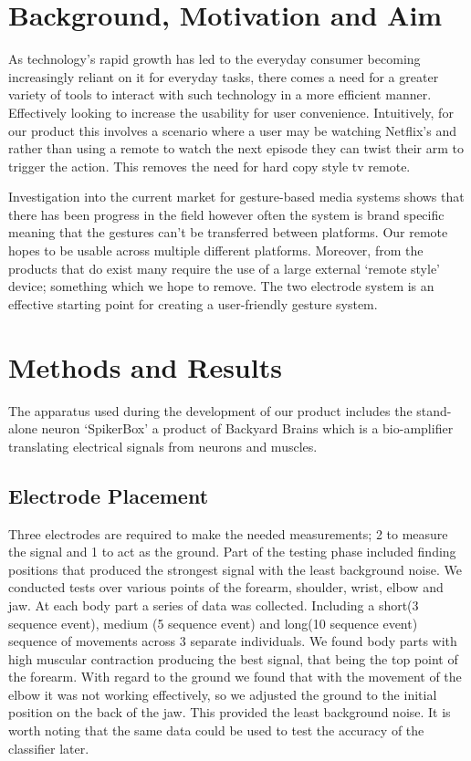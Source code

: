 \documentclass[oneside]{article}
\begin{document}
\section{Background, Motivation and Aim}
As technology's rapid growth has led to the everyday consumer becoming increasingly reliant on it for everyday tasks, there comes a need for a greater variety of tools to interact with such technology in a more efficient manner. Effectively looking to increase the usability for user convenience. Intuitively, for our product this involves a scenario where a user may be watching Netflix’s and rather than using a remote to watch the next episode they can twist their arm to trigger the action. This removes the need for hard copy style tv remote. 

Investigation into the current market for gesture-based media systems shows that there has been progress in the field however often the system is brand specific meaning that the gestures can’t be transferred between platforms. Our remote hopes to be usable across multiple different platforms. Moreover, from the products that do exist many require the use of a large external ‘remote style’ device; something which we hope to remove. The two electrode system is an effective starting point for creating a user-friendly gesture system. 


\section{Methods and Results}
The apparatus used during the development of our product includes the stand-alone neuron ‘SpikerBox’ a product of Backyard Brains which is a bio-amplifier translating electrical signals from neurons and  muscles. 

\subsection{Electrode Placement}
Three electrodes are required to make the needed measurements; 2 to measure the signal and 1 to act as the ground. Part of the testing phase included finding positions that produced the strongest signal with the least background noise. We conducted tests over various points of the forearm, shoulder, wrist, elbow and jaw. At each body part a series of data was collected. Including a short(3 sequence event), medium (5 sequence event) and long(10 sequence event) sequence of movements across 3 separate individuals. We found body parts with high muscular contraction producing the best signal, that being the top point of the forearm. With regard to the ground we found that with the movement of the elbow it was not working effectively, so we adjusted the ground to the initial position on the back of the jaw. This provided the least background noise. It is worth noting that the same data could be used to test the accuracy of the classifier later. 
\end{document}
